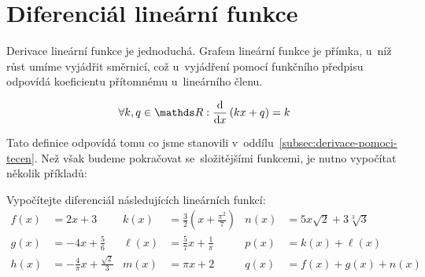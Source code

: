 \section{Diferenciál lineární funkce}
\label{sec:diferencial-linearni-funkce}

Derivace lineární funkce je jednoduchá. Grafem lineární funkce je přímka, u~níž růst
umíme vyjádřit směrnicí, což u~vyjádření pomocí funkčního předpisu odpovídá
koeficientu přítomnému u~lineárního členu.

\begin{lemma}
    \begin{equation*}
        \forall k, q \in \reals: \fracdiff{}{x} \left( kx + q \right) = k
    \end{equation*}
\end{lemma}

Tato definice odpovídá tomu co jsme stanovili
v~oddílu~\ref{subsec:derivace-pomoci-tecen}. Než však budeme pokračovat
se~složitějšími funkcemi, je nutno vypočítat několik příkladů:

\begin{exercise}
    Vypočítejte diferenciál následujících lineárních funkcí:
    \begin{align*}
        f(x) &= 2x + 3
        & k(x) &= \frac{3}{2} \left( x + \frac{\pi^2}{7} \right)
        & n(x) &= 5x \sqrt{2} + 3 \sqrt[3]{3} \\
        g(x) &= -4x + \frac{5}{6}
        & \ell(x) &= \frac{5}{7}x + \frac{1}{\pi}
        & p(x) &= k(x) + \ell(x) \\
        h(x) &= -\frac{4}{\pi}x + \frac{\sqrt{2}}{3}
        & m(x) &= \pi x + 2
        & q(x) &= f(x) + g(x) + n(x)
    \end{align*}
\end{exercise}
